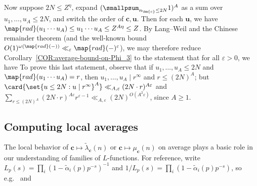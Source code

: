 \documentclass[12pt]{report}
\begin{document}
{Now suppose $2N\leq Z^\eta$,
expand $(\smallpsum_{n_{\bm{c}}\leq 2N}1)^A$ as a sum over $u_1,\dots,u_A\leq 2N$,
and switch the order of $\bm{c},\bm{u}$.
Then for each $\bm{u}$,
we have $\map{rad}(u_1\cdots u_A)
\leq u_1\cdots u_A
\leq Z^{A\eta}\leq Z$.
By Lang--Weil
and the Chinese remainder theorem
(and the well-known bound
$O(1)^{\omega(\map{rad}(-))}
\ll_{\varepsilon}\map{rad}(-)^\varepsilon$),
we may therefore
reduce Corollary~\ref{COR:average-bound-on-Phi_3}
to the statement that for all $\varepsilon>0$,
we have
To prove this last statement,
observe that
if $u_1,\dots,u_A\leq 2N$ and $\map{rad}(u_1\cdots u_A)=r$,
then $u_1,\dots,u_A\mid r^\infty$
and $r\leq (2N)^A$;
but $\card{\set{u\leq 2N:u\mid r^\infty}^A}\ll_{A,\varepsilon}(2N\cdot r)^{A\varepsilon}$
and $\sum_{r\leq (2N)^A}
(2N\cdot r)^{A\varepsilon}
r^{\varepsilon-1}
\ll_{A,\varepsilon}(2N)^{O(A^2\varepsilon)}$,
since $A\geq1$.
}



\subsection{Computing local averages}
\label{SUBSEC:computing-local-averages}

The local behavior of $\bm{c}\mapsto\tilde{\lambda}_{\bm{c}}(n)$ or $\bm{c}\mapsto\mu_{\bm{c}}(n)$ on average
plays a basic role in our understanding of families of $L$-functions.
For reference,
write $L_p(s) = \prod_{i}(1-\tilde{\alpha}_i(p)p^{-s})^{-1}$
and $1/L_p(s) = \prod_{i}(1-\tilde{\alpha}_i(p)p^{-s})$,
so e.g.~
and
\end{document}
